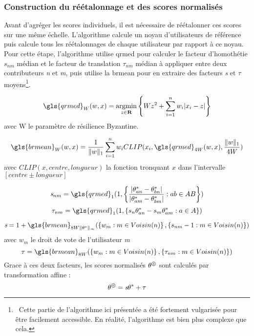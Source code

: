 \subsubsection{Construction du réétalonnage et des scores normalisés}

Avant d'agréger les scores individuels, il est nécessaire de réétalonner ces scores sur une même échelle. L'algorithme calcule un noyau d'utilisateurs de référence puis calcule tous les réétalonnages de chaque utilisateur par rapport à ce noyau. Pour cette étape, l'algorithme utilise \gls{qrmed} pour calculer le facteur d'homothétie $\textit{s}_{nm}$ médian et le facteur de translation $\tau_{nm}$ médian à appliquer entre deux contributeurs \textit{n} et \textit{m}, puis utilise la \gls{brmean} pour en extraire des facteurs \textit{s} et $\tau$ moyens\footnote{~Cette partie de l'algorithme ici présentée a été fortement vulgarisée pour être facilement accessible. En réalité, l'algorithme est bien plus complexe que cela.}.

\begin{equation}
    \gls{qrmed}_W(w,x) = \operatorname*{argmin}_{z \in \mathbf{R}} \set{ Wz^2 + \sum_{i=1}^n w_i|x_i-z|}
\end{equation}
avec W le paramètre de résilience Byzantine.

\begin{equation}
    \gls{brmean}_W(w,x) = \frac{1}{\lVert w \rVert_1} \sum_{i=1}^n w_iCLIP(x_i,\gls{qrmed}_{4W}(w,x),
    \frac{\lVert w \rVert_1}{4W})
\end{equation}
avec $CLIP(x, centre, longueur)$ la fonction tronquant $x$ dans l'intervalle $[centre \pm longueur]$

\begin{equation}
    \textit{s}_{nm}= \gls{qrmed}_1(1,\set{ \frac{|\score_{an}-\score_{bn}|}{|\score_{am}-\score_{bm}|} : ab \in AB})
\end{equation}
\begin{equation}
    \tau_{nm}= \gls{qrmed}_1(1,\set{ s_n\score_{an} - s_m\score_{am} : a \in A })
\end{equation}

\begin{equation}
\textit{s}=1+\gls{brmean}_{8W\lVert \score \rVert_\infty}(\set{w_m : m \in Voisin(n)},\set{s_{nm}-1 : m \in Voisin(n)})
\end{equation}
avec $w_m$ le droit de vote de l'utilisateur \textit{m}
\begin{equation}
\tau=  \gls{brmean}_{8W}(\set{w_m : m \in Voisin(n)},\set{\tau_{nm} : m \in Voisin(n)})
\end{equation}
Grace à ces deux facteurs, les scores normalisés $\theta^\circledS$ sont calculés par transformation affine :
\begin{equation}
\theta^\circledS=\textit{s}\theta^* + \tau
\end{equation}


